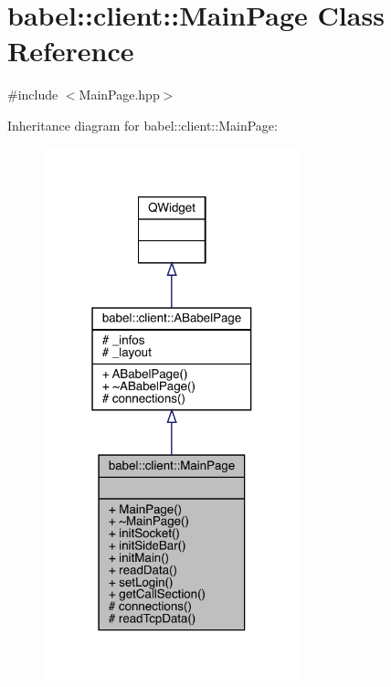 \hypertarget{classbabel_1_1client_1_1_main_page}{}\section{babel\+:\+:client\+:\+:Main\+Page Class Reference}
\label{classbabel_1_1client_1_1_main_page}


{\ttfamily \#include $<$Main\+Page.\+hpp$>$}



Inheritance diagram for babel\+:\+:client\+:\+:Main\+Page\+:\nopagebreak
\begin{figure}[H]
\begin{center}
\leavevmode
\includegraphics[width=211pt]{classbabel_1_1client_1_1_main_page__inherit__graph}
\end{center}
\end{figure}



